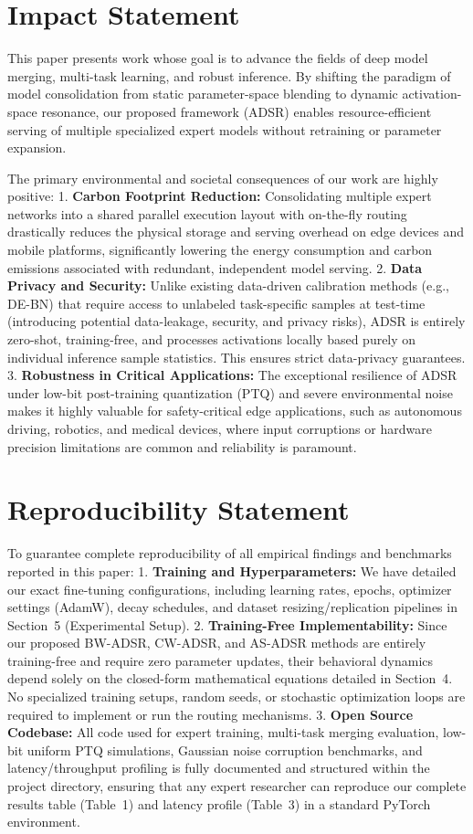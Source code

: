 \documentclass{article}
\theoremstyle{plain}
\theoremstyle{definition}
\theoremstyle{remark}
\begin{document}
\section*{Impact Statement}
This paper presents work whose goal is to advance the fields of deep model merging, multi-task learning, and robust inference. By shifting the paradigm of model consolidation from static parameter-space blending to dynamic activation-space resonance, our proposed framework (ADSR) enables resource-efficient serving of multiple specialized expert models without retraining or parameter expansion. 

The primary environmental and societal consequences of our work are highly positive:
1. \textbf{Carbon Footprint Reduction:} Consolidating multiple expert networks into a shared parallel execution layout with on-the-fly routing drastically reduces the physical storage and serving overhead on edge devices and mobile platforms, significantly lowering the energy consumption and carbon emissions associated with redundant, independent model serving.
2. \textbf{Data Privacy and Security:} Unlike existing data-driven calibration methods (e.g., DE-BN) that require access to unlabeled task-specific samples at test-time (introducing potential data-leakage, security, and privacy risks), ADSR is entirely zero-shot, training-free, and processes activations locally based purely on individual inference sample statistics. This ensures strict data-privacy guarantees.
3. \textbf{Robustness in Critical Applications:} The exceptional resilience of ADSR under low-bit post-training quantization (PTQ) and severe environmental noise makes it highly valuable for safety-critical edge applications, such as autonomous driving, robotics, and medical devices, where input corruptions or hardware precision limitations are common and reliability is paramount.

\section*{Reproducibility Statement}
To guarantee complete reproducibility of all empirical findings and benchmarks reported in this paper:
1. \textbf{Training and Hyperparameters:} We have detailed our exact fine-tuning configurations, including learning rates, epochs, optimizer settings (AdamW), decay schedules, and dataset resizing/replication pipelines in Section~5 (Experimental Setup).
2. \textbf{Training-Free Implementability:} Since our proposed BW-ADSR, CW-ADSR, and AS-ADSR methods are entirely training-free and require zero parameter updates, their behavioral dynamics depend solely on the closed-form mathematical equations detailed in Section~4. No specialized training setups, random seeds, or stochastic optimization loops are required to implement or run the routing mechanisms.
3. \textbf{Open Source Codebase:} All code used for expert training, multi-task merging evaluation, low-bit uniform PTQ simulations, Gaussian noise corruption benchmarks, and latency/throughput profiling is fully documented and structured within the project directory, ensuring that any expert researcher can reproduce our complete results table (Table~1) and latency profile (Table~3) in a standard PyTorch environment.



\end{document}
